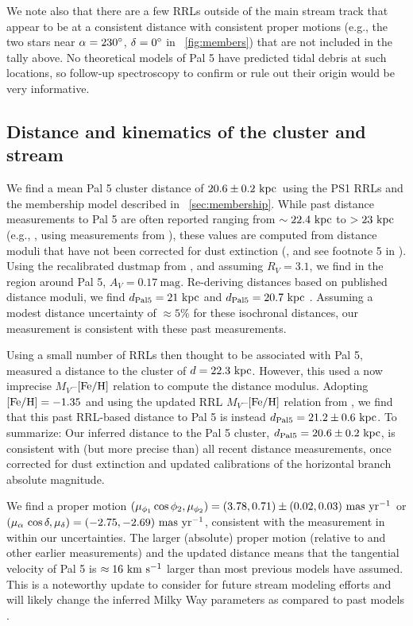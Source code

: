 \documentclass[twocolumn]{aastex63}
\newcommand{\clderr}{\ensuremath{20.6 \pm 0.2~\kpc}}
\begin{document}
We note also that there are a few RRLs outside of the main stream track that appear to be at a consistent distance with consistent proper motions (e.g., the two stars near $\alpha = 230\mbox{$^\circ$}$, $\delta = 0\mbox{$^\circ$}$ in \figurename~\ref{fig:members}) that are not included in the tally above.
No theoretical models of Pal 5 have predicted tidal debris at such locations, so follow-up spectroscopy to confirm or rule out their origin would be very informative.

\subsection{Distance and kinematics of the cluster and stream}

We find a mean Pal 5 cluster distance of \clderr\ using the PS1 RRLs and the membership model described in \sectionname~\ref{sec:membership}.
While past distance measurements to Pal 5 are often reported ranging from $\sim 22.4~\mathrm{kpc}$ to $>23~\mathrm{kpc}$ (e.g., \citealt{Odenkirchen:2009, Erkal:2017}, using measurements from \citealt{Harris:1996, Dotter:2011}), these values are computed from distance moduli that have not been corrected for dust extinction (\citealt{Harris:1996}, and see footnote 5 in \citealt{Fritz:2015}).
Using the recalibrated \citet{Schlegel:1998} dustmap from \citet{Schlafly:2011}, and assuming $R_V=3.1$, we find in the region around Pal 5, $A_V = 0.17~\textrm{mag}$.
Re-deriving distances based on published distance moduli, we find $d_{\rm Pal 5} = 21~\mathrm{kpc}$ \citep{Harris:1996} and $d_{\rm Pal 5} = 20.7~\mathrm{kpc}$ \citep{Dotter:2011}.
Assuming a modest distance uncertainty of $\approx 5\%$ for these isochronal distances, our measurement is consistent with these past measurements.

Using a small number of RRLs then thought to be associated with Pal 5, \citet{Vivas:2006} measured a distance to the cluster of $d = 22.3~\mathrm{kpc}$.
However, this used a now imprecise $M_V$--${[{\rm Fe}/{\rm H}]}$ relation to compute the distance modulus.
Adopting ${[{\rm Fe}/{\rm H}]} = -1.35$ \citep{Ishigaki:2016} and using the updated RRL $M_V$--${[{\rm Fe}/{\rm H}]}$ relation from \citet{Muraveva:2018}, we find that this past RRL-based distance to Pal 5 is instead $d_{\rm Pal 5} = 21.2 \pm 0.6~\mathrm{kpc}$.
To summarize: Our inferred distance to the Pal 5 cluster, $d_{\rm Pal 5} = \clderr$, is consistent with (but more precise than) all recent distance measurements, once corrected for dust extinction and updated calibrations of the horizontal branch absolute magnitude.

We find a proper motion $(\mu_{\phi_1}\cos\phi_2, \mu_{\phi_2}) = (3.78, 0.71) \pm (0.02, 0.03)~\mathrm{mas}~\mathrm{yr}^{-1}$ or $(\mu_\alpha\,\cos\delta, \mu_\delta) = (-2.75, -2.69)~\mathrm{mas}~\mathrm{yr}^{-1}$, consistent with the measurement in \citet{Vasiliev:2019} within our uncertainties.
The larger (absolute) proper motion (relative to \citealt{Fritz:2015} and other earlier measurements) and the updated distance means that the tangential velocity of Pal 5 is $\approx 16~\mathrm{km}~\mathrm{s}^{-1}$ larger than most previous models have assumed.
This is a noteworthy update to consider for future stream modeling efforts and will likely change the inferred Milky Way parameters as compared to past models \citep[e.g.,][]{Kuepper:2015, Bovy:2016}.
\end{document}
